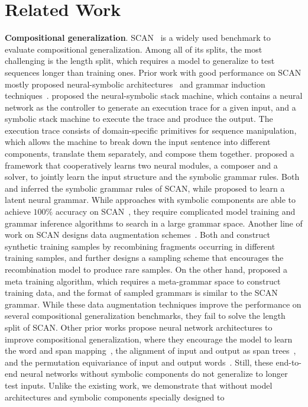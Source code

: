 \documentclass{article}
\begin{document}
\section{Related Work}

\textbf{Compositional generalization}. SCAN~\citep{lake2018generalization} is a widely used benchmark to evaluate compositional generalization. Among all of its splits, the most challenging is the length split, which requires a model to generalize to test sequences longer than training ones.  
Prior work with good performance on SCAN mostly proposed neural-symbolic architectures~\citep{chen2020compositional,liu2020compositional} and grammar induction techniques~\citep{nye2020learning,shaw2021compositional, kim2021sequence}. \cite{chen2020compositional} proposed the neural-symbolic stack machine, which contains a neural network as the controller to generate an execution trace for a given input, and a symbolic stack machine to execute the trace and produce the output. The execution trace consists of domain-specific primitives for sequence manipulation, which allows the machine to break down the input sentence into different components, translate them separately, and compose them together. \cite{liu2020compositional} proposed a framework that cooperatively learns two neural modules, a composer and a solver, to jointly learn the input structure and the symbolic grammar rules. Both \cite{nye2020learning} and \cite{shaw2021compositional} inferred the symbolic grammar rules of SCAN, while \cite{kim2021sequence} proposed to learn a latent neural grammar. While approaches with symbolic components are able to achieve $100\%$ accuracy on SCAN~\citep{chen2020compositional,liu2020compositional,nye2020learning,shaw2021compositional}, they require complicated model training and grammar inference algorithms to search in a large grammar space. Another line of work on SCAN designs data augmentation schemes~\citep{andreas-2020-good,ekina2021recombine,lake2019compositional}. Both \cite{andreas-2020-good} and \cite{ekina2021recombine} construct synthetic training samples by recombining fragments occurring in different training samples, and \cite{ekina2021recombine} further designs a sampling scheme that encourages the recombination model to produce rare samples. On the other hand, \cite{lake2019compositional} proposed a meta training algorithm, which requires a meta-grammar space to construct training data, and the format of sampled grammars is similar to the SCAN grammar. While these data augmentation techniques improve the performance on several compositional generalization benchmarks, they fail to solve the length split of SCAN. Other prior works propose neural network architectures to improve compositional generalization, where they encourage the model to learn the word and span mapping~\citep{russin2019compositional,li2019compositional}, the alignment of input and output as span trees~\citep{herzig2020span}, and the permutation equivariance of input and output words~\citep{gordon2019permutation}. Still, these end-to-end neural networks without symbolic components do not generalize to longer test inputs. Unlike the existing work, we demonstrate that without model architectures and symbolic components specially designed to 
\end{document}
